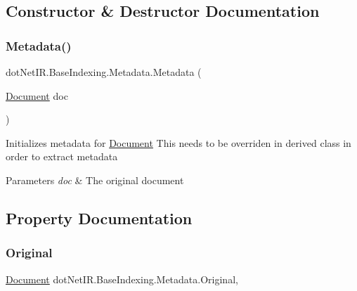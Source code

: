 \subsection{Constructor \& Destructor Documentation}
\hypertarget{classdot_net_i_r_1_1_base_indexing_1_1_metadata_a56f25f691e16450838af09943c68c1c3}{}\label{classdot_net_i_r_1_1_base_indexing_1_1_metadata_a56f25f691e16450838af09943c68c1c3} 
\subsubsection{\texorpdfstring{Metadata()}{Metadata()}}
{\footnotesize\ttfamily dot\+Net\+I\+R.\+Base\+Indexing.\+Metadata.\+Metadata (\begin{DoxyParamCaption}\item[{\hyperlink{classdot_net_i_r_1_1_base_indexing_1_1_document}{Document}}]{doc }\end{DoxyParamCaption})}



Initializes metadata for \hyperlink{classdot_net_i_r_1_1_base_indexing_1_1_document}{Document} This needs to be overriden in derived class in order to extract metadata 


\begin{DoxyParams}{Parameters}
{\em doc} & The original document\\
\hline
\end{DoxyParams}


\subsection{Property Documentation}
\hypertarget{classdot_net_i_r_1_1_base_indexing_1_1_metadata_a0df188ffc37ffeec37ad5e28b28c7021}{}\label{classdot_net_i_r_1_1_base_indexing_1_1_metadata_a0df188ffc37ffeec37ad5e28b28c7021} 
\subsubsection{\texorpdfstring{Original}{Original}}
{\footnotesize\ttfamily \hyperlink{classdot_net_i_r_1_1_base_indexing_1_1_document}{Document} dot\+Net\+I\+R.\+Base\+Indexing.\+Metadata.\+Original\hspace{0.3cm}{\ttfamily [get]}, {\ttfamily [set]}}



